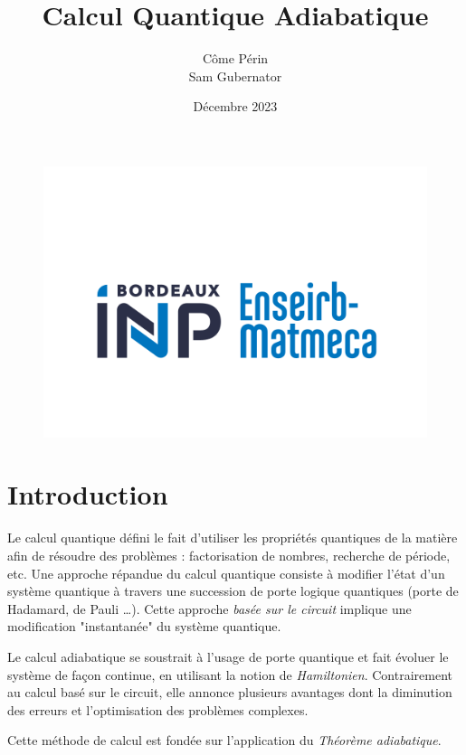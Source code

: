 \documentclass{article}
\title{Calcul Quantique Adiabatique }
\author{Côme Périn \\ Sam Gubernator}
\date{Décembre 2023}
\begin{document}
\begin{figure}[h]
    \centering
    \includegraphics[scale=0.35]{rsc/Logo_ENSEIRB-MATMECA-Bordeaux_INP.png}
    \label{fig:enter-label}
    \maketitle
\end{figure}


\tableofcontents
\newpage


\section{Introduction}

Le calcul quantique défini le fait d'utiliser les propriétés quantiques de la matière afin de résoudre des problèmes : factorisation de nombres, recherche de période, etc. Une approche répandue du calcul quantique consiste à modifier l'état d'un système quantique à travers une succession de porte logique quantiques (porte de Hadamard, de Pauli \dots). Cette approche \emph{basée sur le circuit} implique une modification "instantanée" du système quantique.

\medskip

\noindent Le calcul adiabatique se soustrait à l'usage de porte quantique et fait évoluer le système de façon continue, en utilisant la notion de \emph{Hamiltonien}.
Contrairement au calcul basé sur le circuit, elle annonce plusieurs avantages dont la diminution des erreurs et l'optimisation des problèmes complexes.

\medskip

\noindent Cette méthode de calcul est fondée sur l'application du \emph{Théorème adiabatique}.
\end{document}
